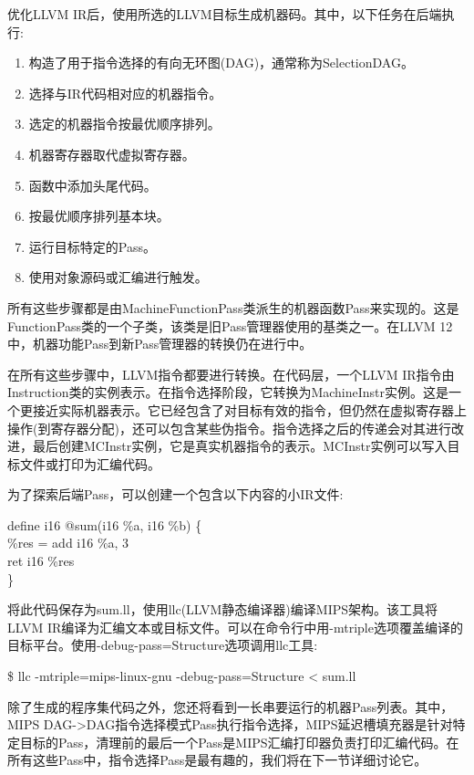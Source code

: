 优化LLVM IR后，使用所选的LLVM目标生成机器码。其中，以下任务在后端执行:\par

\begin{enumerate}
\item 构造了用于指令选择的有向无环图(DAG)，通常称为SelectionDAG。
\item 选择与IR代码相对应的机器指令。
\item 选定的机器指令按最优顺序排列。
\item 机器寄存器取代虚拟寄存器。
\item 函数中添加头尾代码。
\item 按最优顺序排列基本块。
\item 运行目标特定的Pass。
\item 使用对象源码或汇编进行触发。
\end{enumerate}

所有这些步骤都是由MachineFunctionPass类派生的机器函数Pass来实现的。这是FunctionPass类的一个子类，该类是旧Pass管理器使用的基类之一。在LLVM 12中，机器功能Pass到新Pass管理器的转换仍在进行中。\par

在所有这些步骤中，LLVM指令都要进行转换。在代码层，一个LLVM IR指令由Instruction类的实例表示。在指令选择阶段，它转换为MachineInstr实例。这是一个更接近实际机器表示。它已经包含了对目标有效的指令，但仍然在虚拟寄存器上操作(到寄存器分配)，还可以包含某些伪指令。指令选择之后的传递会对其进行改进，最后创建MCInstr实例，它是真实机器指令的表示。MCInstr实例可以写入目标文件或打印为汇编代码。\par

为了探索后端Pass，可以创建一个包含以下内容的小IR文件:\par

\begin{tcolorbox}[colback=white,colframe=black]
define i16 @sum(i16 \%a, i16 \%b) \{ \\
\hspace*{0.5cm}\%res = add i16 \%a, 3 \\
\hspace*{0.5cm}ret i16 \%res \\
\}
\end{tcolorbox}

将此代码保存为sum.ll，使用llc(LLVM静态编译器)编译MIPS架构。该工具将LLVM IR编译为汇编文本或目标文件。可以在命令行中用-mtriple选项覆盖编译的目标平台。使用-debug-pass=Structure选项调用llc工具:\par

\begin{tcolorbox}[colback=white,colframe=black]
\$ llc -mtriple=mips-linux-gnu -debug-pass=Structure < sum.ll
\end{tcolorbox}

除了生成的程序集代码之外，您还将看到一长串要运行的机器Pass列表。其中，MIPS DAG->DAG指令选择模式Pass执行指令选择，MIPS延迟槽填充器是针对特定目标的Pass，清理前的最后一个Pass是MIPS汇编打印器负责打印汇编代码。在所有这些Pass中，指令选择Pass是最有趣的，我们将在下一节详细讨论它。\par












